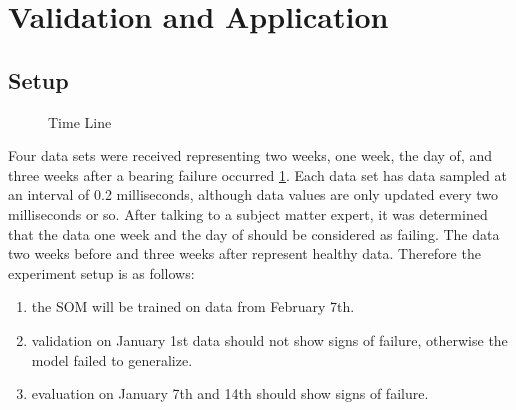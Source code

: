 \section{Validation and Application}

\subsection{Setup}


\begin{figure}
    \centering
    \caption{Time Line}
    \label{fig:time_line}
\end{figure}

Four data sets were received representing two weeks, one week, the day of, 
and three weeks after a bearing failure occurred \ref{fig:time_line}.
Each data set has data sampled at an interval of 0.2 milliseconds, although data values are only updated every two milliseconds or so.
After talking to a subject matter expert, it was determined that the data one week and the day of should be considered as failing.
The data two weeks before and three weeks after represent healthy data.
Therefore the experiment setup is as follows:
\begin{enumerate}
    \item the SOM will be trained on data from February 7th.
    \item validation on January 1st data should not show signs of failure, otherwise the model failed to generalize.
    \item evaluation on January 7th and 14th should show signs of failure.
\end{enumerate}



